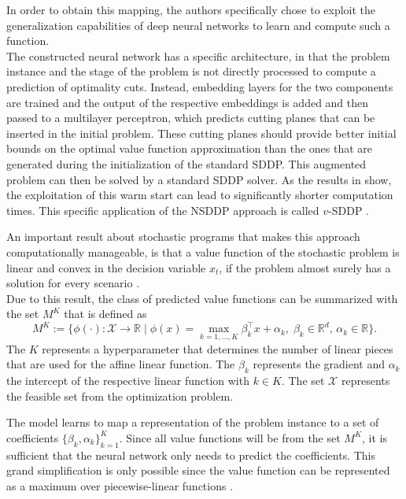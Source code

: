 In order to obtain this mapping, the authors specifically chose to exploit the generalization capabilities of deep neural networks to learn and compute such a function.\\
The constructed neural network has a specific architecture, in that the problem instance and the stage of the problem is not directly processed to compute a prediction of optimality cuts.
Instead, embedding layers for the two components are trained and the output of the respective embeddings is added and then passed to a multilayer perceptron, which predicts cutting planes that can be inserted in the initial problem.
These cutting planes should provide better initial bounds on the optimal value function approximation than the ones that are generated during the initialization of the standard SDDP.
This augmented problem can then be solved by a standard SDDP solver.
As the results in \cite{NSDDP} show, the exploitation of this warm start can lead to significantly shorter computation times.
This specific application of the NSDDP approach is called $v$-SDDP \cite{NSDDP}.

An important result about stochastic programs that makes this approach computationally manageable, is that a value function of the stochastic problem is linear and convex in the decision variable $x_t$, if the problem almost surely has a solution for every scenario \cite{NSDDP}. \\
Due to this result, the class of predicted value functions can be summarized with the set $M^{K}$ that is defined as
\begin{equation}
    M^{K} := \big\{\phi( \cdot ): \mathcal{X} \rightarrow \mathbb{R} \; |\; \phi(x) = \max_{k = 1, \dots, K} \beta^\intercal_k x + \alpha_k, \;  \beta_k \in \mathbb{R}^d,\, \alpha_k \in \mathbb{R} \big\}.
\end{equation}
The $K$ represents a hyperparameter that determines the number of linear pieces that are used for the affine linear function.
The $\beta_k$ represents the gradient and $\alpha_k$ the intercept of the respective linear function with $k \in K$.
The set $\mathcal{X}$ represents the feasible set from the optimization problem.

The model learns to map a representation of the problem instance to a set of coefficients $\{\beta_k, \alpha_k\}_{k=1}^{K}$.
Since all value functions will be from the set $M^K$, it is sufficient that the neural network only needs to predict the coefficients.
This grand simplification is only possible since the value function can be represented as a maximum over piecewise-linear functions \cite{NSDDP}.

